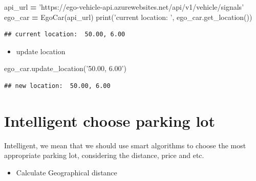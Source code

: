 \documentclass[]{book}
\newenvironment{Shaded}{\begin{snugshade}}{\end{snugshade}}
\newcommand{\BuiltInTok}[1]{#1}
\newcommand{\NormalTok}[1]{#1}
\newcommand{\OperatorTok}[1]{\textcolor[rgb]{0.81,0.36,0.00}{\textbf{#1}}}
\newcommand{\StringTok}[1]{\textcolor[rgb]{0.31,0.60,0.02}{#1}}
\providecommand{\tightlist}{%
  \setlength{\itemsep}{0pt}\setlength{\parskip}{0pt}}
\begin{document}
\begin{Shaded}
\begin{Highlighting}[]
\NormalTok{api_url }\OperatorTok{=} \StringTok{'https://ego-vehicle-api.azurewebsites.net/api/v1/vehicle/signals'}
\NormalTok{ego_car }\OperatorTok{=}\NormalTok{ EgoCar(api_url)}
\BuiltInTok{print}\NormalTok{(}\StringTok{'current location: '}\NormalTok{, ego_car.get_location())}
\end{Highlighting}
\end{Shaded}

\begin{verbatim}
## current location:  50.00, 6.00
\end{verbatim}

\begin{itemize}
\tightlist
\item
  update location
\end{itemize}

\begin{Shaded}
\begin{Highlighting}[]
\NormalTok{ego_car.update_location(}\StringTok{'50.00, 6.00'}\NormalTok{)}
\end{Highlighting}
\end{Shaded}

\begin{verbatim}
## new location:  50.00, 6.00
\end{verbatim}

\hypertarget{intelligent-choose-parking-lot}{%
\chapter{Intelligent choose parking lot}\label{intelligent-choose-parking-lot}}

Intelligent, we mean that we should use smart algorithms to choose the most appropriate parking lot, considering the distance, price and etc.

\begin{itemize}
\tightlist
\item
  Calculate Geographical distance
\end{itemize}
\end{document}
